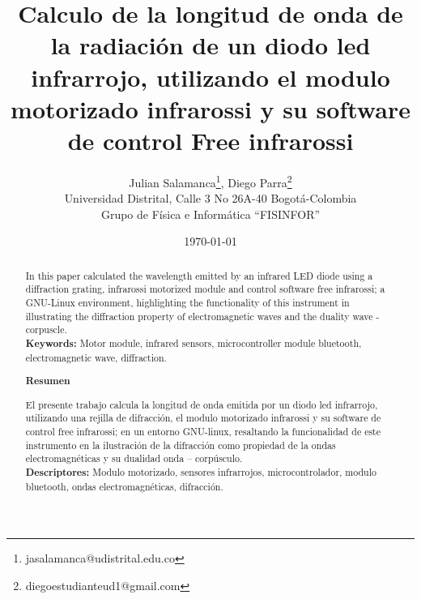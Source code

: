 \documentclass[12]{article}
\title{\bf{Calculo de la longitud de onda de la radiación de un diodo led infrarrojo, utilizando el modulo motorizado infrarossi y su software de control Free infrarossi}}
\author{Julian Salamanca\footnote{jasalamanca@udistrital.edu.co}, Diego Parra\footnote{diegoestudianteud1@gmail.com} \\
  Universidad Distrital, Calle 3 No 26A-40 Bogotá-Colombia\\
  Grupo de Física e Informática ``FISINFOR''
}
\date{\today}
\def\tablename{Tabla}%
\begin{document}
\renewcommand{\tablename}{Tabla}
\maketitle
\vspace{-0.8cm}

\begin{abstract}
In this paper calculated the wavelength emitted by  an infrared LED diode using a diffraction grating, infrarossi motorized module and control software  free infrarossi; a GNU-Linux environment, highlighting the functionality of this instrument in illustrating the diffraction property of electromagnetic waves and the duality wave - corpuscle. \\
{\bf{Keywords:}} Motor module, infrared sensors, microcontroller module bluetooth, electromagnetic wave, diffraction.


\begin{center}
{\bf{Resumen}} 
\end{center}
El presente trabajo calcula la longitud de onda emitida por un diodo led infrarrojo, utilizando una rejilla de difracción, el modulo motorizado  infrarossi y su software de control free infrarossi; en un entorno GNU-linux, resaltando la funcionalidad de este instrumento en la ilustración de la difracción como propiedad de la ondas electromagnéticas y su dualidad onda – corpúsculo. \\
{\bf{Descriptores:}} Modulo motorizado, sensores infrarrojos, microcontrolador, modulo bluetooth, ondas electromagnéticas, difracción. 
\end{abstract}



\end{document}

